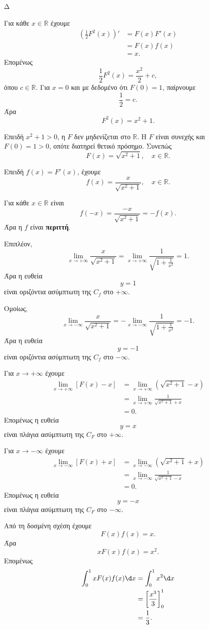 \begin{thema}{Δ}
\begin{erwthma}
\item Για κάθε $x\in\mathbb{R}$ έχουμε
\begin{align*}
\left(\frac{1}{2}F^2(x)\right)'
&=F(x)F'(x)\\
&=F(x)f(x)\\
&=x.
\end{align*}
Επομένως
\[
\frac{1}{2}F^2(x)=\frac{x^2}{2}+c,
\]
όπου $c\in\mathbb{R}$. Για $x=0$ και με δεδομένο ότι $F(0)=1$, παίρνουμε
\[
\frac12=c.
\]
Άρα
\[
F^2(x)=x^2+1.
\]

Επειδή $x^2+1>0$, η $F$ δεν μηδενίζεται στο $\mathbb{R}$. Η $F$ είναι συνεχής και $F(0)=1>0$, οπότε διατηρεί θετικό πρόσημο. Συνεπώς
\[
{F(x)=\sqrt{x^2+1}},\quad x\in\mathbb{R}.
\]

\item Επειδή $f(x)=F'(x)$, έχουμε
\[
{f(x)=\frac{x}{\sqrt{x^2+1}}},\quad x\in\mathbb{R}.
\]

Για κάθε $x\in\mathbb{R}$ είναι
\[
f(-x)=\frac{-x}{\sqrt{x^2+1}}=-f(x).
\]
Άρα η $f$ είναι \textbf{περιττή}.

Επιπλέον,
\[
\lim_{x\to+\infty}\frac{x}{\sqrt{x^2+1}}
=\lim_{x\to+\infty}
\frac{1}{\sqrt{1+\frac{1}{x^2}}}
=1.
\]
Άρα η ευθεία
\[
{y=1}
\]
είναι οριζόντια ασύμπτωτη της $C_f$ στο $+\infty$.

Ομοίως,
\[
\lim_{x\to-\infty}\frac{x}{\sqrt{x^2+1}}
=-\lim_{x\to-\infty}
\frac{1}{\sqrt{1+\frac{1}{x^2}}}
=-1.
\]
Άρα η ευθεία
\[
{y=-1}
\]
είναι οριζόντια ασύμπτωτη της $C_f$ στο $-\infty$.

\item Για $x\to+\infty$ έχουμε
\begin{align*}
\lim_{x\to+\infty}\left[F(x)-x\right]
&=\lim_{x\to+\infty}
\left(\sqrt{x^2+1}-x\right)\\
&=\lim_{x\to+\infty}
\frac{1}{\sqrt{x^2+1}+x}\\
&=0.
\end{align*}
Επομένως η ευθεία
\[
{y=x}
\]
είναι πλάγια ασύμπτωτη της $C_F$ στο $+\infty$.

Για $x\to-\infty$ έχουμε
\begin{align*}
\lim_{x\to-\infty}\left[F(x)+x\right]
&=\lim_{x\to-\infty}
\left(\sqrt{x^2+1}+x\right)\\
&=\lim_{x\to-\infty}
\frac{1}{\sqrt{x^2+1}-x}\\
&=0.
\end{align*}
Επομένως η ευθεία
\[
{y=-x}
\]
είναι πλάγια ασύμπτωτη της $C_F$ στο $-\infty$.

\item Από τη δοσμένη σχέση έχουμε
\[
F(x)f(x)=x.
\]
Άρα
\[
xF(x)f(x)=x^2.
\]
Επομένως
\begin{align*}
\int_0^1xF(x)f(x)\d x
&=\int_0^1x^2\d x\\
&=\left[\frac{x^3}{3}\right]_0^1\\
&={\frac13}.
\end{align*}
\end{erwthma}
\end{thema}

